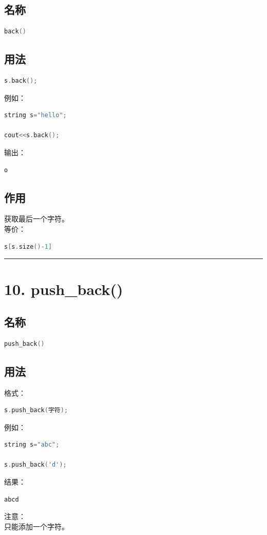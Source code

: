 \documentclass[10pt,twocolumn]{extarticle}
\begin{document}
\subsection{名称}
\begin{lstlisting}[language=C++]
back()
\end{lstlisting}

\subsection{用法}
\begin{lstlisting}[language=C++]
s.back();
\end{lstlisting}
例如：
\begin{lstlisting}[language=C++]
string s="hello";

cout<<s.back();
\end{lstlisting}
输出：
\begin{lstlisting}
o
\end{lstlisting}

\subsection{作用}
获取最后一个字符。\\
等价：
\begin{lstlisting}[language=C++]
s[s.size()-1]
\end{lstlisting}

\noindent\rule{\linewidth}{0.4pt}

\section{10. push\_back()}

\subsection{名称}
\begin{lstlisting}[language=C++]
push_back()
\end{lstlisting}

\subsection{用法}
格式：
\begin{lstlisting}[language=C++]
s.push_back(字符);
\end{lstlisting}
例如：
\begin{lstlisting}[language=C++]
string s="abc";

s.push_back('d');
\end{lstlisting}
结果：
\begin{lstlisting}
abcd
\end{lstlisting}
注意：\\
只能添加一个字符。
\end{document}
